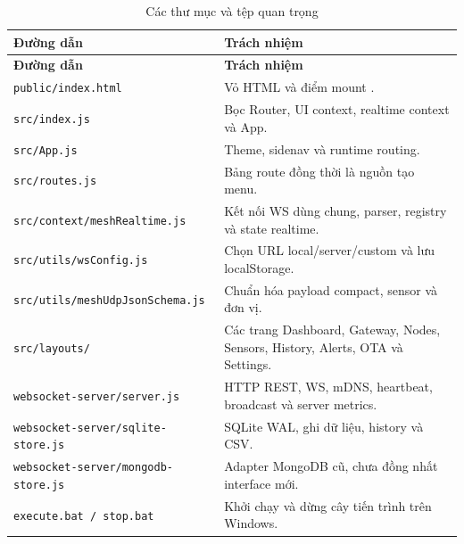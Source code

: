 \documentclass[a4paper]{article}
\newcommand{\codeword}[1]{\texttt{\detokenize{#1}}}
\newcommand{\pathcode}[1]{\nolinkurl{#1}}
\begin{document}
\begin{longtable}{p{5.3cm}p{8.7cm}}
\caption{Các thư mục và tệp quan trọng}\\
\toprule
\textbf{Đường dẫn} & \textbf{Trách nhiệm}\\
\midrule\endfirsthead
\toprule
\textbf{Đường dẫn} & \textbf{Trách nhiệm}\\
\midrule\endhead
\pathcode{public/index.html} & Vỏ HTML và điểm mount \codeword{root}.\\
\pathcode{src/index.js} & Bọc Router, UI context, realtime context và App.\\
\pathcode{src/App.js} & Theme, sidenav và runtime routing.\\
\pathcode{src/routes.js} & Bảng route đồng thời là nguồn tạo menu.\\
\pathcode{src/context/meshRealtime.js} & Kết nối WS dùng chung, parser, registry và state realtime.\\
\pathcode{src/utils/wsConfig.js} & Chọn URL local/server/custom và lưu localStorage.\\
\pathcode{src/utils/meshUdpJsonSchema.js} & Chuẩn hóa payload compact, sensor và đơn vị.\\
\pathcode{src/layouts/} & Các trang Dashboard, Gateway, Nodes, Sensors, History, Alerts, OTA và Settings.\\
\pathcode{websocket-server/server.js} & HTTP REST, WS, mDNS, heartbeat, broadcast và server metrics.\\
\pathcode{websocket-server/sqlite-store.js} & SQLite WAL, ghi dữ liệu, history và CSV.\\
\pathcode{websocket-server/mongodb-store.js} & Adapter MongoDB cũ, chưa đồng nhất interface mới.\\
\pathcode{execute.bat / stop.bat} & Khởi chạy và dừng cây tiến trình trên Windows.\\
\bottomrule
\end{longtable}
\end{document}
